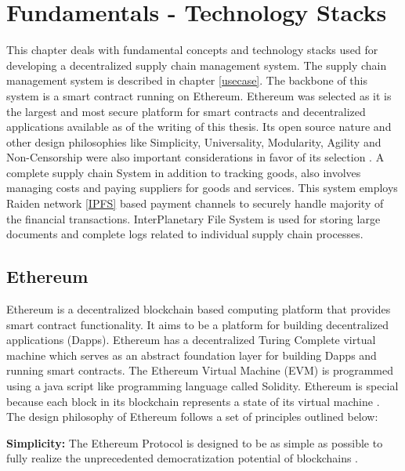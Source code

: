 \section{Fundamentals - Technology Stacks} \label{TS} 
This chapter deals with fundamental concepts and technology stacks used for developing a decentralized supply chain management system. The supply chain management system is described in chapter \ref{usecase}. The backbone of this system is a smart contract running on Ethereum. Ethereum was selected as it is the largest and most secure platform for smart contracts and decentralized applications available as of the writing of this thesis. Its open source nature and other design philosophies like Simplicity, Universality, Modularity, Agility and Non-Censorship were also important considerations in favor of its selection \cite{eth:001}. A complete supply chain System in addition to tracking goods, also involves managing costs and paying suppliers for goods and services. This system employs Raiden network \ref{IPFS} based payment channels to securely handle majority of the financial transactions. InterPlanetary File System is used for storing large documents and complete logs related to individual supply chain processes. 
 

\subsection{Ethereum}\label{eth}
Ethereum is a decentralized blockchain based computing platform that provides smart contract functionality. It aims to be a platform for building decentralized applications (Dapps). Ethereum has a decentralized Turing Complete virtual machine which serves as an abstract foundation layer for building Dapps and running smart contracts. The Ethereum Virtual Machine (EVM) is programmed using a java script like programming language called Solidity. Ethereum is special because each block in its blockchain represents a state of its virtual machine \cite{eth:001}. The design philosophy of Ethereum follows a set of principles outlined below:

\textbf{Simplicity:} The Ethereum Protocol is designed to be as simple as possible to fully realize the unprecedented democratization potential of blockchains \cite{eth:001}. 

